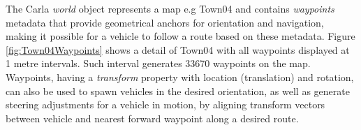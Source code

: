 The Carla \textit{world} object represents a map e.g Town04 and contains \textit{waypoints} metadata that provide geometrical anchors for orientation and navigation, making it possible for a vehicle to follow a route based on these metadata. Figure \ref{fig:Town04Waypoints} shows a detail of Town04 with all waypoints displayed at 1 metre intervals. Such interval generates 33670 waypoints on the map. Waypoints, having a \textit{transform} property with location (translation) and rotation, can also be used to spawn vehicles in the desired orientation, as well as generate steering adjustments for a vehicle in motion, by aligning transform vectors between vehicle and nearest forward waypoint along a desired route.

